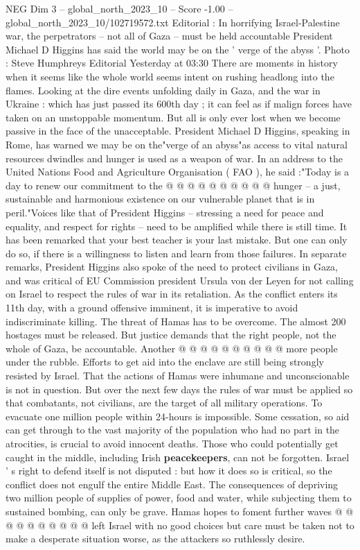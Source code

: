 \begin{textsample}{NEG Dim 3 – global\_north\_2023\_10 – Score -1.00 – global\_north\_2023\_10/102719572.txt}  \label{ex:f3_neg_183}
Editorial : In horrifying Israel-Palestine war, the perpetrators -- not all of Gaza -- must be held accountable President Michael D Higgins has said the world may be on the ' verge of the abyss '.
Photo : Steve Humphreys Editorial Yesterday at 03:30 There are moments in history when it seems like the whole world seems intent on rushing headlong into the flames.
Looking at the dire events unfolding daily in Gaza, and the war in Ukraine : which has just passed its 600th day ; it can feel as if malign forces have taken on an unstoppable momentum.
But all is only ever lost when we become passive in the face of the unacceptable.
President Michael D Higgins, speaking in Rome, has warned we may be on the"verge of an abyss"as access to vital natural resources dwindles and hunger is used as a weapon of war.
In an address to the United Nations Food and Agriculture Organisation ( FAO ), he said :"Today is a day to renew our commitment to the @ @ @ @ @ @ @ @ @ @ hunger -- a just, sustainable and harmonious existence on our vulnerable planet that is in peril."Voices like that of President Higgins -- stressing a need for peace and equality, and respect for rights -- need to be amplified while there is still time.
It has been remarked that your best teacher is your last mistake.
But one can only do so, if there is a willingness to listen and learn from those failures.
In separate remarks, President Higgins also spoke of the need to protect civilians in Gaza, and was critical of EU Commission president Ursula von der Leyen for not calling on Israel to respect the rules of war in its retaliation.
As the conflict enters its 11th day, with a ground offensive imminent, it is imperative to avoid indiscriminate killing.
The threat of Hamas has to be overcome.
The almost 200 hostages must be released.
But justice demands that the right people, not the whole of Gaza, be accountable.
Another @ @ @ @ @ @ @ @ @ @ more people under the rubble.
Efforts to get aid into the enclave are still being strongly resisted by Israel.
That the actions of Hamas were inhumane and unconscionable is not in question.
But over the next few days the rules of war must be applied so that combatants, not civilians, are the target of all military operations.
To evacuate one million people within 24-hours is impossible.
Some cessation, so aid can get through to the vast majority of the population who had no part in the atrocities, is crucial to avoid innocent deaths.
Those who could potentially get caught in the middle, including Irish \textbf{peacekeepers}, can not be forgotten.
Israel ' s right to defend itself is not disputed : but how it does so is critical, so the conflict does not engulf the entire Middle East.
The consequences of depriving two million people of supplies of power, food and water, while subjecting them to sustained bombing, can only be grave.
Hamas hopes to foment further waves @ @ @ @ @ @ @ @ @ @ left Israel with no good choices but care must be taken not to make a desperate situation worse, as the attackers so ruthlessly desire.

\end{textsample}
